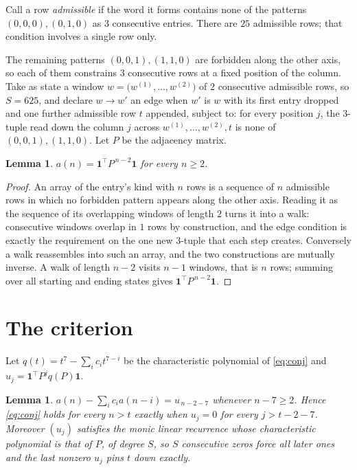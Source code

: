 \documentclass[11pt,a4paper]{article}
\theoremstyle{plain}
\newtheorem{lemma}[theorem]{Lemma}
\theoremstyle{definition}
\begin{document}
Call a row \emph{admissible} if the word it forms contains none of the patterns
$(0,0,0), (0,1,0)$ as $3$ consecutive entries. There are $25$ admissible rows; that condition
involves a single row only.

The remaining patterns $(0,0,1), (1,1,0)$ are forbidden along the other axis, so each of them
constrains $3$ consecutive rows at a fixed position of the column. Take as state a
window $w=\bigl(w^{(1)},\dots,w^{(2)}\bigr)$ of $2$ consecutive admissible
rows, so $S=625$, and declare $w\to w'$ an edge when $w'$ is $w$ with its first entry
dropped and one further admissible row $t$ appended, subject to: for every position
$j$, the $3$-tuple read down the column $j$ across $w^{(1)},\dots,w^{(2)},t$
is none of $(0,0,1), (1,1,0)$. Let $P$ be the adjacency matrix.

\begin{lemma}\label{lem:walk}
$a(n)=\mathbf{1}^{\!\top}P^{\,n-2}\mathbf{1}$ for every $n\ge2$.
\end{lemma}

\begin{proof}
An array of the entry's kind with $n$ rows is a sequence of $n$ admissible rows in
which no forbidden pattern appears along the other axis. Reading it as the sequence of its
overlapping windows of length $2$ turns it into a walk: consecutive windows overlap in
$1$ rows by construction, and the edge condition is exactly the requirement on the one
new $3$-tuple that each step creates. Conversely a walk reassembles into such an array,
and the two constructions are mutually inverse. A walk of length $n-2$ visits $n-1$
windows, that is $n$ rows; summing over all starting and ending states gives
$\mathbf{1}^{\!\top}P^{\,n-2}\mathbf{1}$.
\end{proof}

\section{The criterion}

Let $q(t)=t^{7}-\sum_i c_i t^{7-i}$ be the characteristic polynomial of
\eqref{eq:conj} and $u_j=\mathbf{1}^{\!\top}P^{j}q(P)\mathbf{1}$.

\begin{lemma}\label{lem:crit}
$a(n)-\sum_i c_i a(n-i)=u_{\,n-2-7}$ whenever $n-7\ge2$. Hence
\eqref{eq:conj} holds for every $n>t$ exactly when $u_j=0$ for every
$j>t-2-7$. Moreover $(u_j)$ satisfies the monic linear recurrence whose
characteristic polynomial is that of $P$, of degree $S$, so $S$ consecutive zeros force all
later ones and the last nonzero $u_j$ pins $t$ down exactly.
\end{lemma}
\end{document}
